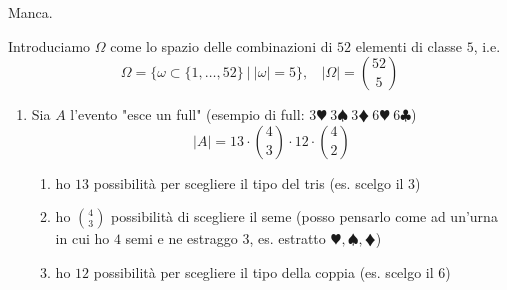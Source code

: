 \Soluzione

Manca.

\Soluzione

Introduciamo $\Omega $ come lo spazio delle combinazioni di $52$ elementi di classe $5$, i.e.
\begin{equation*}
\Omega =\{\omega \subset \{1,\dots ,52\} \ |\ | \omega | =5\} ,\ \ \ \ | \Omega | =\binom{52}{5}
\end{equation*}
\begin{enumerate}
\item Sia $A$ l'evento "esce un full" (esempio di full: $3\varheartsuit \ 3\spadesuit \ 3\vardiamondsuit \ 6\varheartsuit \ 6\clubsuit $)\begin{equation*}
| A| =13\cdot \binom{4}{3} \cdot 12\cdot \binom{4}{2}
\end{equation*}
\begin{enumerate}
\item ho $13$ possibilità per scegliere il tipo del tris (es. scelgo il $3$)
\item ho $\binom{4}{3}$ possibilità di scegliere il seme (posso pensarlo come ad un'urna in cui ho $4$ semi e ne estraggo $3$, es. estratto $\varheartsuit ,\spadesuit ,\vardiamondsuit $)
\item ho $12$ possibilità per scegliere il tipo della coppia (es. scelgo il $6$)


\end{enumerate}
\end{enumerate}
